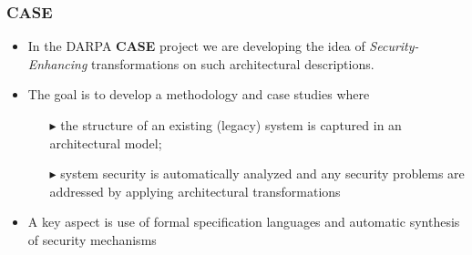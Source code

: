 \documentclass{beamer}
\begin{document}
\begin{frame}\frametitle{CASE}
\begin{itemize}

\item In the DARPA \textbf{CASE} project we are developing the idea of
  \emph{Security-Enhancing} transformations on such architectural
  descriptions.

\item The goal is to develop a methodology and case studies where
  \begin{itemize}
  \item [$\blacktriangleright$]
       the structure of an existing (legacy) system is captured in an architectural model;

 \item [$\blacktriangleright$] system security is automatically analyzed and any security
   problems are addressed by applying architectural transformations
 \end{itemize}

\item A key aspect is use of formal specification languages and
  automatic synthesis of security mechanisms

\end{itemize}

\end{frame}
\end{document}
